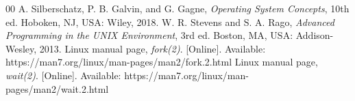 \documentclass[conference]{IEEEtran}
\begin{document}
\balance
\begin{thebibliography}{00}
 A. Silberschatz, P. B. Galvin, and G. Gagne,
\emph{Operating System Concepts}, 10th ed. Hoboken, NJ, USA: Wiley, 2018.
 W. R. Stevens and S. A. Rago,
\emph{Advanced Programming in the UNIX Environment}, 3rd ed. Boston, MA, USA: Addison-Wesley, 2013.
 Linux manual page, \emph{fork(2)}. [Online]. Available: https://man7.org/linux/man-pages/man2/fork.2.html
 Linux manual page, \emph{wait(2)}. [Online]. Available: https://man7.org/linux/man-pages/man2/wait.2.html
\end{thebibliography}
\end{document}
